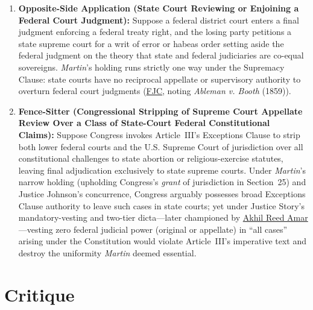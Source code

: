 \documentclass[12pt]{article}
\begin{document}
\begin{enumerate}
    \item \textbf{Opposite-Side Application (State Court Reviewing or Enjoining a Federal Court Judgment):} Suppose a federal district court enters a final judgment enforcing a federal treaty right, and the losing party petitions a state supreme court for a writ of error or habeas order setting aside the federal judgment on the theory that state and federal judiciaries are co-equal sovereigns. \textit{Martin}'s holding runs strictly one way under the Supremacy Clause: state courts have no reciprocal appellate or supervisory authority to overturn federal court judgments (\href{https://www.fjc.gov/history/cases/cases-that-shaped-the-federal-courts/martin-v-hunter-s-lessee}{FJC}, noting \textit{Ableman v. Booth} (1859)).

    \item \textbf{Fence-Sitter (Congressional Stripping of Supreme Court Appellate Review Over a Class of State-Court Federal Constitutional Claims):} Suppose Congress invokes Article~III's Exceptions Clause to strip both lower federal courts and the U.S. Supreme Court of jurisdiction over all constitutional challenges to state abortion or religious-exercise statutes, leaving final adjudication exclusively to state supreme courts. Under \textit{Martin}'s narrow holding (upholding Congress's \textit{grant} of jurisdiction in Section~25) and Justice Johnson's concurrence, Congress arguably possesses broad Exceptions Clause authority to leave such cases in state courts; yet under Justice Story's mandatory-vesting and two-tier dicta---later championed by \href{https://texaslawreview.org/congressional-power-to-strip-state-courts-of-jurisdiction/}{Akhil Reed Amar}---vesting zero federal judicial power (original or appellate) in ``all cases'' arising under the Constitution would violate Article~III's imperative text and destroy the uniformity \textit{Martin} deemed essential.
\end{enumerate}

\section{Critique}
\end{document}
